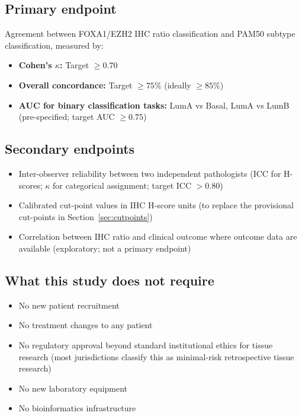 \documentclass[11pt, a4paper]{article}
\begin{document}
\subsection{Primary endpoint}

Agreement between FOXA1/EZH2 IHC ratio
classification and PAM50 subtype classification,
measured by:
\begin{itemize}
    \item \textbf{Cohen's $\kappa$:} Target $\geq 0.70$
    \item \textbf{Overall concordance:}
    Target $\geq 75\%$ (ideally $\geq 85\%$)
    \item \textbf{AUC for binary classification tasks:}
    LumA vs Basal, LumA vs LumB
    (pre-specified; target AUC $\geq 0.75$)
\end{itemize}

\subsection{Secondary endpoints}

\begin{itemize}
    \item Inter-observer reliability between
    two independent pathologists
    (ICC for H-scores; $\kappa$ for categorical
    assignment; target ICC $> 0.80$)
    \item Calibrated cut-point values in IHC
    H-score units (to replace the provisional
    cut-points in Section~\ref{sec:cutpoints})
    \item Correlation between IHC ratio and
    clinical outcome where outcome data are
    available (exploratory; not a primary endpoint)
\end{itemize}

\subsection{What this study does not require}

\begin{itemize}[noitemsep]
    \item No new patient recruitment
    \item No treatment changes to any patient
    \item No regulatory approval beyond
    standard institutional ethics
    for tissue research (most jurisdictions
    classify this as minimal-risk retrospective
    tissue research)
    \item No new laboratory equipment
    \item No bioinformatics infrastructure
\end{itemize}
\end{document}
